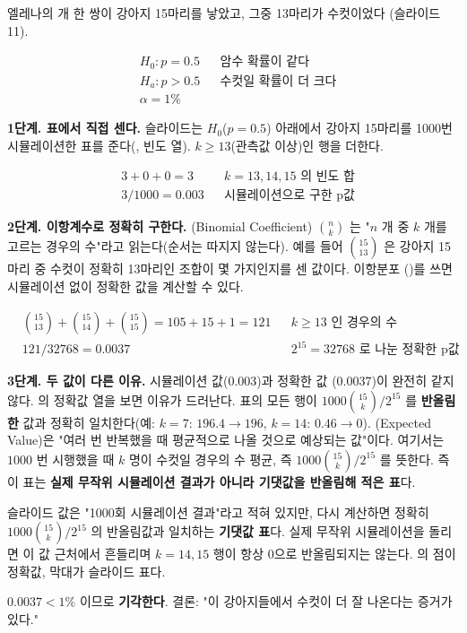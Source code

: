 \begin{example}[강아지 15마리 중 수컷 13마리]
\label{ex:ht-puppy}
엘레나의 개 한 쌍이 강아지 15마리를 낳았고, 그중 13마리가 수컷이었다
(슬라이드 11).

\begin{align*}
  &H_0: p = 0.5 && \text{암수 확률이 같다}\\
  &H_a: p > 0.5 && \text{수컷일 확률이 더 크다}\\
  &\alpha = 1\%
\end{align*}

\textbf{1단계. 표에서 직접 센다.} 슬라이드는 $H_0$($p=0.5$) 아래에서 강아지
15마리를 1000번 시뮬레이션한 표를 준다(, 빈도 열).
$k \ge 13$(관측값 이상)인 행을 더한다.

\begin{align*}
  &3 + 0 + 0 = 3 && \text{$k=13,14,15$ 의 빈도 합}\\
  &3 / 1000 = 0.003 && \text{시뮬레이션으로 구한 p값}
\end{align*}

\textbf{2단계. 이항계수로 정확히 구한다.} (Binomial
Coefficient) $\binom{n}{k}$ 는 "$n$ 개 중 $k$ 개를 고르는 경우의 수"라고
읽는다(순서는 따지지 않는다). 예를 들어 $\binom{15}{13}$ 은 강아지 15마리
중 수컷이 정확히 13마리인 조합이 몇 가지인지를 센 값이다. 이항분포
()를 쓰면 시뮬레이션 없이 정확한 값을 계산할 수 있다.

\begin{align*}
  &\binom{15}{13}+\binom{15}{14}+\binom{15}{15} = 105+15+1 = 121
    && \text{$k \ge 13$ 인 경우의 수}\\
  &121/32768 = 0.0037 && \text{$2^{15}=32768$ 로 나눈 정확한 p값}
\end{align*}

\textbf{3단계. 두 값이 다른 이유.} 시뮬레이션 값(0.003)과 정확한 값
(0.0037)이 완전히 같지 않다. 의 정확값 열을 보면 이유가
드러난다. 표의 모든 행이 $1000\binom{15}{k}/2^{15}$ 를 \textbf{반올림한}
값과 정확히 일치한다(예: $k{=}7$: $196.4 \to 196$, $k{=}14$:
$0.46 \to 0$). (Expected Value)은 "여러 번 반복했을 때 평균적으로
나올 것으로 예상되는 값"이다. 여기서는 $1000$ 번 시행했을 때 $k$ 명이 수컷일
경우의 수 평균, 즉 $1000\binom{15}{k}/2^{15}$ 를 뜻한다. 즉 이 표는
\textbf{실제 무작위 시뮬레이션 결과가 아니라 기댓값을 반올림해 적은 표}다.

\begin{pitfall}
\label{pit:ht-r4}
슬라이드 값은 "1000회 시뮬레이션 결과"라고 적혀 있지만, 다시 계산하면
정확히 $1000\binom{15}{k}/2^{15}$ 의 반올림값과 일치하는
\textbf{기댓값 표}다. 실제 무작위 시뮬레이션을 돌리면 이 값 근처에서
흔들리며 $k{=}14,15$ 행이 항상 0으로 반올림되지는 않는다. 의
점이 정확값, 막대가 슬라이드 표다.
\end{pitfall}

$0.0037 < 1\%$ 이므로 \textbf{기각한다}. 결론: "이 강아지들에서 수컷이 더
잘 나온다는 증거가 있다."
\end{example}

